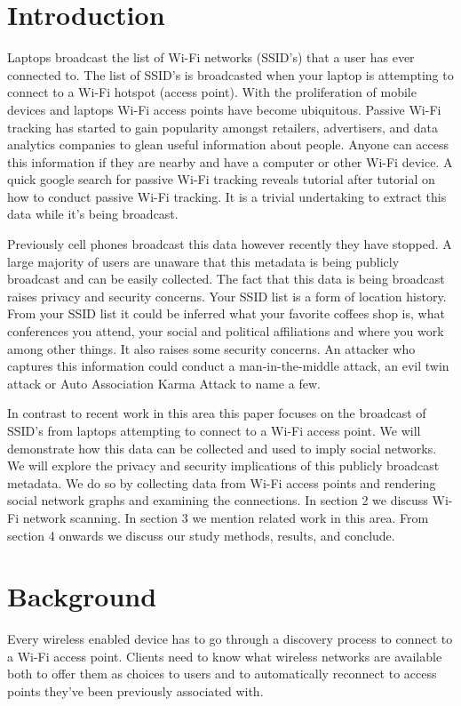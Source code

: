 \documentclass[letterpaper,twocolumn,10pt]{article}
\begin{document}
\section{Introduction}
Laptops broadcast the list of Wi-Fi networks (SSID's) that a user has ever connected to. The list of SSID's is broadcasted when your laptop is attempting to connect to a Wi-Fi hotspot (access point). With the proliferation of mobile devices and laptops Wi-Fi access points have become ubiquitous. Passive Wi-Fi tracking has started to gain popularity amongst retailers, advertisers, and data analytics companies to glean useful information about people. Anyone can access this information if they are nearby and have a computer or other Wi-Fi device. A quick google search for passive Wi-Fi tracking reveals tutorial after tutorial on how to conduct passive Wi-Fi tracking. It is a trivial undertaking to extract this data while it's being broadcast. 

Previously cell phones broadcast this data however recently they have stopped. A large majority of users are unaware that this metadata is being publicly broadcast and can be easily collected. The fact that this data is being broadcast raises privacy and security concerns. Your SSID list is a form of location history. From your SSID list it could be inferred what your favorite coffees shop is, what conferences you attend, your social and political affiliations and where you work among other things. It also raises some security concerns. An attacker who captures this information could conduct a man-in-the-middle attack, an evil twin attack or Auto Association Karma Attack to name a few. 

In contrast to recent work in this area this paper focuses on the broadcast of SSID's from laptops attempting to connect to a Wi-Fi access point. We will demonstrate how this data can be collected and used to imply social networks. We will explore the privacy and security implications of this publicly broadcast metadata. We do so by collecting data from Wi-Fi access points and rendering social network graphs and examining the connections. In section 2 we discuss Wi-Fi network scanning. In section 3 we mention related work in this area. From section 4 onwards we discuss our study methods, results, and conclude.



\section{Background}
Every wireless enabled device has to go through a discovery process to connect to a Wi-Fi access point. Clients need to know what wireless networks are available both to offer them as choices to users and to automatically reconnect to access points they've been previously associated with.
\end{document}
